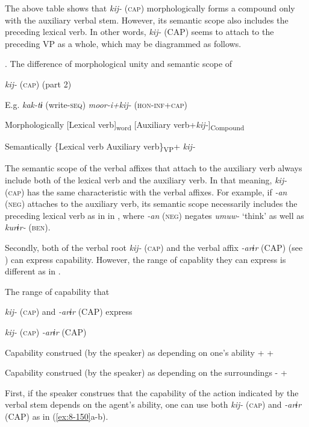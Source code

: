 The above table shows that \textit{kij-} (\textsc{cap}) morphologically forms a compound only with the auxiliary verbal stem. However, its semantic scope also includes the preceding lexical verb. In other words, \textit{kij-} (CAP) seems to attach to the preceding VP as a whole, which may be diagrammed as follows.

\begin{table}
\caption{\label{tab:key:90}. The difference of morphological unity and semantic scope of} \textmd{\textit{kij-}}\textmd{ (\textsc{cap}) (part 2)}

E.g.  \textit{kak-tɨ} (write-\textsc{seq})  \textit{moor-i+kij-} (\textsc{hon}-\textsc{inf}+\textsc{cap})

Morphologically  [Lexical verb]\textsubscript{word}  [Auxiliary verb+\textit{kij-}]\textsubscript{Compound}

Semantically  \{Lexical verb  Auxiliary verb\}\textsubscript{VP}+ \textit{kij-}
\end{table}

The semantic scope of the verbal affixes that attach to the auxiliary verb always include both of the lexical verb and the auxiliary verb. In that meaning, \textit{kij-} (\textsc{cap}) has the same characteristic with the verbal affixes. For example, if \textit{-an} (\textsc{neg}) attaches to the auxiliary verb, its semantic scope necessarily includes the preceding lexical verb as in  in , where \textit{-an} (\textsc{neg}) negates \textit{umuw-} ‘think’ as well as \textit{kurɨr-} (\textsc{ben}).

  Secondly, both of the verbal root \textit{kij-} (\textsc{cap}) and the verbal affix \textit{-arɨr} (CAP) (see ) can express capability. However, the range of capablity they can express is different as in .

\begin{table}
\caption{\label{tab:key:91}The range of capability that} \textmd{\textit{kij-}}\textmd{ (\textsc{cap}) and} \textmd{\textit{-arɨr}}\textmd{ (CAP) express}

  \textit{kij-} (\textsc{cap})  \textit{-arɨr} (CAP)

Capability construed (by the speaker) as depending on one’s ability  +  +

Capability construed (by the speaker) as depending on the surroundings  -  +
\end{table}

First, if the speaker construes that the capability of the action indicated by the verbal stem depends on the agent’s ability, one can use both \textit{kij-} (\textsc{cap}) and \textit{-arɨr} (CAP) as in (\ref{ex:8-150}a-b).

